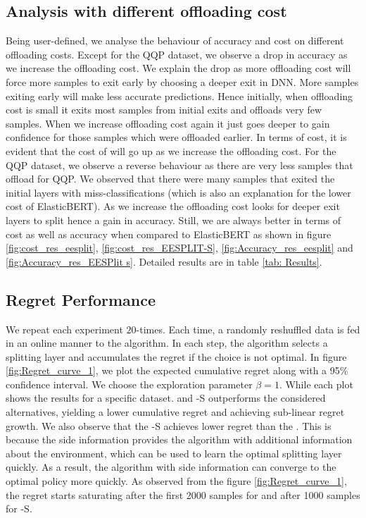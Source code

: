 \subsection{Analysis with different offloading cost}\label{sec:offloading}
Being user-defined, we analyse the behaviour of accuracy and cost on different offloading costs. Except for the QQP dataset, we observe a drop in accuracy as we increase the offloading cost. We explain the drop as more offloading cost will force more samples to exit early by choosing a deeper exit in DNN. More samples exiting early will make less accurate predictions.
Hence initially, when offloading cost is small it exits most samples from initial exits and offloads very few samples. When we increase offloading cost again it just goes deeper to gain confidence for those samples which were offloaded earlier. In terms of cost, it is evident that the cost of \our{} will go up as we increase the offloading cost. For the QQP dataset, we observe a reverse behaviour as there are very less samples that offload for QQP. We observed that there were many samples that exited the initial layers with miss-classifications (which is also an explanation for the lower cost of ElasticBERT).  As we increase the offloading cost \our{} looks for deeper exit layers to split hence a gain in accuracy.
Still, we are always better in terms of cost as well as accuracy when compared to ElasticBERT as shown in figure \ref{fig:cost_res_eesplit}, \ref{fig:cost_res_EESPLIT-S}, \ref{fig:Accuracy_res_eesplit} and \ref{fig:Accuracy_res_EESPlit s}. Detailed results are in table \ref{tab: Results}.









\subsection{Regret Performance}\label{sec: regret}
We repeat each experiment $20$-times. Each time, a randomly reshuffled data is fed in an online manner to the algorithm. 
In each step, the algorithm selects a splitting layer and accumulates the regret if the choice is not optimal. In figure \ref{fig:Regret_curve_1}, we plot the expected cumulative regret along with a 95\% confidence interval. We choose the exploration parameter $\beta = 1$. While each plot shows the results for a specific dataset. \our{} and \our{}-S outperforms the considered alternatives, yielding a lower cumulative regret and achieving sub-linear regret growth. We also observe that the \our{}-S achieves lower regret than the \our{}. This is because the side information provides the algorithm with additional information about the environment, which can be used to learn the optimal splitting layer quickly. As a result, the algorithm with side information can converge to the optimal policy more quickly. As observed from the figure \ref{fig:Regret_curve_1}, the regret starts saturating after the first 2000 samples for \our{} and after 1000 samples for \our{}-S.
